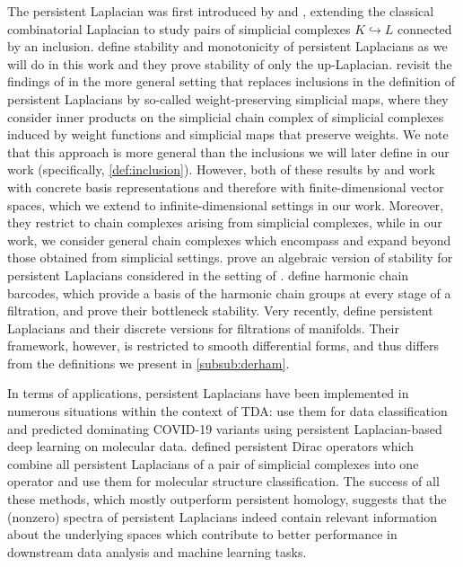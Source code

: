 \documentclass[11pt]{article}
\theoremstyle{definition}
\theoremstyle{remark}
\begin{document}
The persistent Laplacian was first introduced by \citet{first_peristent_lap2} and \citet{first_persistent_lap}, extending the classical combinatorial Laplacian to study pairs of simplicial complexes $K \hookrightarrow L$ connected by an inclusion. \citet{mww} define stability and monotonicity of persistent Laplacians as we will do in this work and they prove stability of only the up-Laplacian. \citet{pl_simpmaps} revisit the findings of \citet{mww} in the more general setting that replaces inclusions in the definition of persistent Laplacians by so-called weight-preserving simplicial maps, where they consider inner products on the simplicial chain complex of simplicial complexes induced by weight functions and simplicial maps that preserve weights. We note that this approach is more general than the inclusions we will later define in our work (specifically, \cref{def:inclusion}). However, both of these results by \citet{mww} and \citet{pl_simpmaps} work with concrete basis representations and therefore with finite-dimensional vector spaces, which we extend to infinite-dimensional settings in our work. Moreover, they restrict to chain complexes arising from simplicial complexes, while in our work, we consider general chain complexes which encompass and expand beyond those obtained from simplicial settings. \citet{algstab} prove an algebraic version of stability for persistent Laplacians considered in the setting of \citet{mww}. \citet{hou_harmonic_chains} define harmonic chain barcodes, which provide a basis of the harmonic chain groups at every stage of a filtration, and prove their bottleneck stability. Very recently, \citet{su2024persistentrhamhodgelaplacianseulerian} define persistent Laplacians and their discrete versions for filtrations of manifolds. Their framework, however, is restricted to smooth differential forms, and thus differs from the definitions we present in \cref{subsub:derham}.

In terms of applications, persistent Laplacians have been implemented in numerous situations within the context of TDA: \citet{plapp_1,plapp_3} use them for data classification and \citet{pl_omicron} predicted dominating COVID-19 variants using persistent Laplacian-based deep learning on molecular data. \citet{wbx} defined persistent Dirac operators which combine all persistent Laplacians of a pair of simplicial complexes into one operator and use them for molecular structure classification. The success of all these methods, which mostly outperform persistent homology, suggests that the (nonzero) spectra of persistent Laplacians indeed contain relevant information about the underlying spaces which contribute to better performance in downstream data analysis and machine learning tasks.
\end{document}
